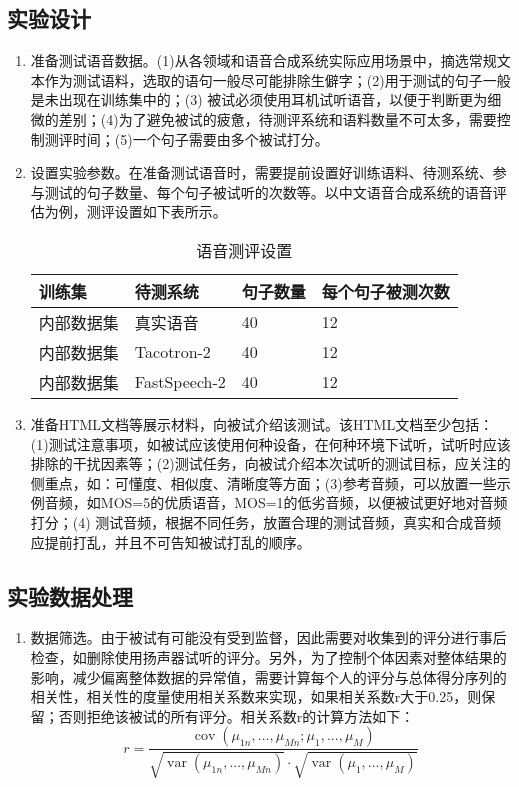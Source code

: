 \documentclass[cn,10pt,math=newtx,citestyle=gb7714-2015,bibstyle=gb7714-2015]{elegantbook}
\begin{document}
\subsection{实验设计}
\begin{enumerate}
  \item 准备测试语音数据。(1)从各领域和语音合成系统实际应用场景中，摘选常规文本作为测试语料，选取的语句一般尽可能排除生僻字；(2)用于测试的句子一般是未出现在训练集中的；(3)	被试必须使用耳机试听语音，以便于判断更为细微的差别；(4)为了避免被试的疲惫，待测评系统和语料数量不可太多，需要控制测评时间；(5)一个句子需要由多个被试打分。
  \item 设置实验参数。在准备测试语音时，需要提前设置好训练语料、待测系统、参与测试的句子数量、每个句子被试听的次数等。以中文语音合成系统的语音评估为例，测评设置如下表所示。
  \begin{table}[htbp]
    \centering
    \caption{语音测评设置}
      \begin{tabular}{llll}
      \toprule
      训练集 & 待测系统 & 句子数量 & 每个句子被测次数 \\
      \midrule
      内部数据集 & 真实语音 & 40 & 12 \\
      内部数据集 & Tacotron-2 & 40 & 12 \\
      内部数据集 & FastSpeech-2 & 40 & 12 \\
      \bottomrule
      \end{tabular}%
  \end{table}%

  \item 准备HTML文档等展示材料，向被试介绍该测试。该HTML文档至少包括：(1)测试注意事项，如被试应该使用何种设备，在何种环境下试听，试听时应该排除的干扰因素等；(2)测试任务，向被试介绍本次试听的测试目标，应关注的侧重点，如：可懂度、相似度、清晰度等方面；(3)参考音频，可以放置一些示例音频，如MOS=5的优质语音，MOS=1的低劣音频，以便被试更好地对音频打分；(4)	测试音频，根据不同任务，放置合理的测试音频，真实和合成音频应提前打乱，并且不可告知被试打乱的顺序。
  
\end{enumerate}

\subsection{实验数据处理}
\begin{enumerate}
  \item 数据筛选。由于被试有可能没有受到监督，因此需要对收集到的评分进行事后检查，如删除使用扬声器试听的评分。另外，为了控制个体因素对整体结果的影响，减少偏离整体数据的异常值，需要计算每个人的评分与总体得分序列的相关性，相关性的度量使用相关系数来实现，如果相关系数r大于0.25，则保留；否则拒绝该被试的所有评分。相关系数r的计算方法如下：
  \begin{equation}
    r=\frac{\mathop{cov}(\mu_{1n},...,\mu_{Mn};\mu_1,...,\mu_M)}{\sqrt{\mathop{var}(\mu_{1n},...,\mu_{Mn})}\cdot \sqrt{\mathop{var}(\mu_1,...,\mu_M)}}
  \end{equation}
\end{enumerate}
\end{document}
